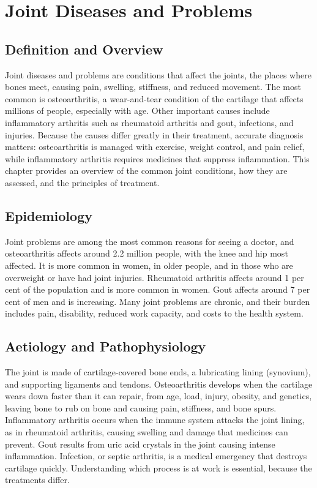 \chapter{Joint Diseases and Problems}

\section*{Definition and Overview}
Joint diseases and problems are conditions that affect the joints, the places where bones meet, causing pain, swelling, stiffness, and reduced movement. The most common is osteoarthritis, a wear-and-tear condition of the cartilage that affects millions of people, especially with age. Other important causes include inflammatory arthritis such as rheumatoid arthritis and gout, infections, and injuries. Because the causes differ greatly in their treatment, accurate diagnosis matters: osteoarthritis is managed with exercise, weight control, and pain relief, while inflammatory arthritis requires medicines that suppress inflammation. This chapter provides an overview of the common joint conditions, how they are assessed, and the principles of treatment.

\section*{Epidemiology}
Joint problems are among the most common reasons for seeing a doctor, and osteoarthritis affects around 2.2 million people, with the knee and hip most affected. It is more common in women, in older people, and in those who are overweight or have had joint injuries. Rheumatoid arthritis affects around 1 per cent of the population and is more common in women. Gout affects around 7 per cent of men and is increasing. Many joint problems are chronic, and their burden includes pain, disability, reduced work capacity, and costs to the health system.

\section*{Aetiology and Pathophysiology}
The joint is made of cartilage-covered bone ends, a lubricating lining (synovium), and supporting ligaments and tendons. Osteoarthritis develops when the cartilage wears down faster than it can repair, from age, load, injury, obesity, and genetics, leaving bone to rub on bone and causing pain, stiffness, and bone spurs. Inflammatory arthritis occurs when the immune system attacks the joint lining, as in rheumatoid arthritis, causing swelling and damage that medicines can prevent. Gout results from uric acid crystals in the joint causing intense inflammation. Infection, or septic arthritis, is a medical emergency that destroys cartilage quickly. Understanding which process is at work is essential, because the treatments differ.


